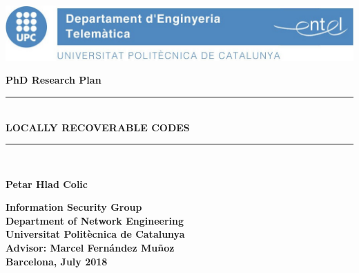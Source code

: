 \documentclass[12pt,a4paper,twoside,openright]{book}
\begin{document}
\newcommand{\titol}{Locally Recoverable Codes}
\newcommand{\shortitol}{LRC Codes}
\newcommand{\autor}{Petar Hlad Colic}

\frontmatter
\begin{titlepage}
   	\includegraphics[scale=0.3]{images/entel_logo.jpg}

   	\begin{center}
   	\vspace{2em}
   	\Large\textbf{\textbf{PhD Research Plan}}\\
   	\vspace{3em}
   	\rule{\linewidth}{0.5pt}\\
   	\LARGE\textbf{\MakeUppercase{\titol}} \\
   	\rule{\linewidth}{0.5pt}\\
   	\vspace{3em}
   	
   	\LARGE\textbf{\autor}\\
   	\vspace{3em}
   	
    \Large\textbf{Information Security Group}\\
    \Large\textbf{Department of Network Engineering}\\
   	\Large\textbf{Universitat Politècnica de Catalunya}\\
   	
   	
   	\vspace{2em}
   	\Large\textbf{Advisor: Marcel Fern\'andez Muñoz}\\
   	\vspace{3em}
   	\large\textbf{Barcelona, July 2018}\\
   	\end{center}
\end{titlepage} 

\clearpage{\thispagestyle{empty}\cleardoublepage}
\tableofcontents
\clearpage{\thispagestyle{empty}\cleardoublepage}
\pagestyle{fancy}
\setlength{\parskip}{3mm plus1mm minus1.5mm}
\mainmatter


\clearpage{\thispagestyle{empty}\cleardoublepage}

\clearpage{\thispagestyle{empty}\cleardoublepage}

\clearpage{\thispagestyle{empty}\cleardoublepage}


%

%

\clearpage{\thispagestyle{empty}\cleardoublepage}
{}
\printbibliography
\end{document}
